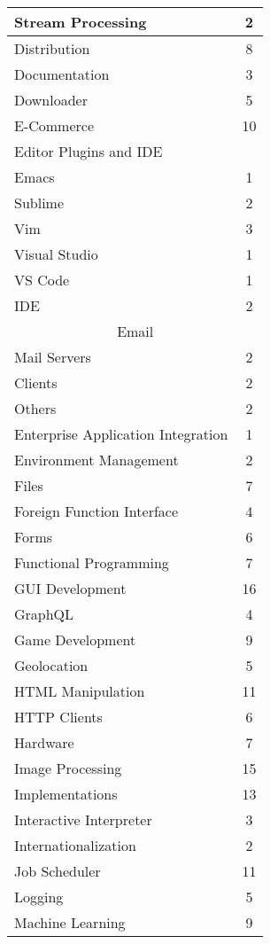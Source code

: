 \begin{longtable} {|l|c|}
    Stream Processing & 2\\
    \hline
    Distribution & 8\\
    \hline
    Documentation & 3\\
    \hline
    Downloader & 5\\
    \hline
    E-Commerce & 10\\
    \hline
    \multicolumn{2}{|l|}{Editor Plugins and IDE}\\
    \hline
    Emacs & 1\\
    Sublime & 2\\
    Vim & 3\\
    Visual Studio & 1\\
    VS Code & 1\\
    IDE & 2\\
    \hline
    \multicolumn{2}{|c|}{Email}\\
    \hline
    Mail Servers & 2\\
    Clients & 2\\
    Others & 2\\
    \hline
    Enterprise Application Integration & 1\\
    \hline
    Environment Management & 2\\
    \hline
    Files & 7\\
    \hline
    Foreign Function Interface & 4\\
    \hline
    Forms & 6\\
    \hline
    Functional Programming & 7\\
    \hline
    GUI Development & 16\\
    \hline
    GraphQL & 4\\
    \hline
    Game Development & 9\\
    \hline
    Geolocation & 5\\
    \hline
    HTML Manipulation & 11\\
    \hline
    HTTP Clients & 6\\
    \hline
    Hardware & 7\\
    \hline
    Image Processing & 15\\
    \hline
    Implementations & 13\\
    \hline
    Interactive Interpreter & 3\\
    \hline
    Internationalization & 2\\
    \hline
    Job Scheduler & 11\\
    \hline
    Logging & 5\\
    \hline
    Machine Learning & 9\\

\end{longtable}
